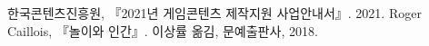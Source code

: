 \documentclass[11pt]{article}
\begin{document}
\begin{thebibliography}{99}
한국콘텐츠진흥원, 『2021년 게임콘텐츠 제작지원 사업안내서』. 2021.
Roger Caillois, 『놀이와 인간』. 이상률 옮김, 문예출판사, 2018.

\end{thebibliography}
\end{document}
